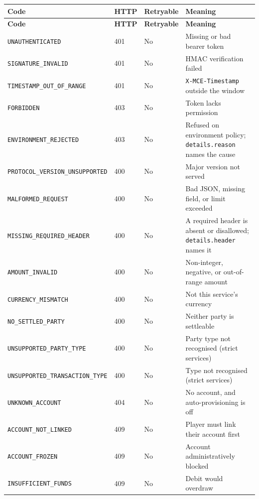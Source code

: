 \documentclass[11pt,a4paper]{article}
\newcommand{\code}[1]{\texttt{\small #1}}
\begin{document}
\begin{longtable}{L{5.0cm} L{1.0cm} L{1.6cm} L{6.4cm}}
\toprule
\textbf{Code} & \textbf{HTTP} & \textbf{Retryable} & \textbf{Meaning}\\
\midrule
\endfirsthead
\toprule
\textbf{Code} & \textbf{HTTP} & \textbf{Retryable} & \textbf{Meaning}\\
\midrule
\endhead
\code{UNAUTHENTICATED}               & 401 & No  & Missing or bad bearer token\\
\code{SIGNATURE\_INVALID}            & 401 & No  & HMAC verification failed\\
\code{TIMESTAMP\_OUT\_OF\_RANGE}     & 401 & No  & \code{X-MCE-Timestamp} outside the window\\
\code{FORBIDDEN}                     & 403 & No  & Token lacks permission\\
\code{ENVIRONMENT\_REJECTED}         & 403 & No  & Refused on environment policy; \code{details.reason} names the cause\\
\code{PROTOCOL\_VERSION\_UNSUPPORTED}& 400 & No  & Major version not served\\
\code{MALFORMED\_REQUEST}            & 400 & No  & Bad JSON, missing field, or limit exceeded\\
\code{MISSING\_REQUIRED\_HEADER}     & 400 & No  & A required header is absent or disallowed; \code{details.header} names it\\
\code{AMOUNT\_INVALID}               & 400 & No  & Non-integer, negative, or out-of-range amount\\
\code{CURRENCY\_MISMATCH}            & 400 & No  & Not this service's currency\\
\code{NO\_SETTLED\_PARTY}            & 400 & No  & Neither party is settleable\\
\code{UNSUPPORTED\_PARTY\_TYPE}      & 400 & No  & Party type not recognised (strict services)\\
\code{UNSUPPORTED\_TRANSACTION\_TYPE}& 400 & No  & Type not recognised (strict services)\\
\code{UNKNOWN\_ACCOUNT}              & 404 & No  & No account, and auto-provisioning is off\\
\code{ACCOUNT\_NOT\_LINKED}          & 409 & No  & Player must link their account first\\
\code{ACCOUNT\_FROZEN}               & 409 & No  & Account administratively blocked\\
\code{INSUFFICIENT\_FUNDS}           & 409 & No  & Debit would overdraw\\

\end{longtable}
\end{document}
